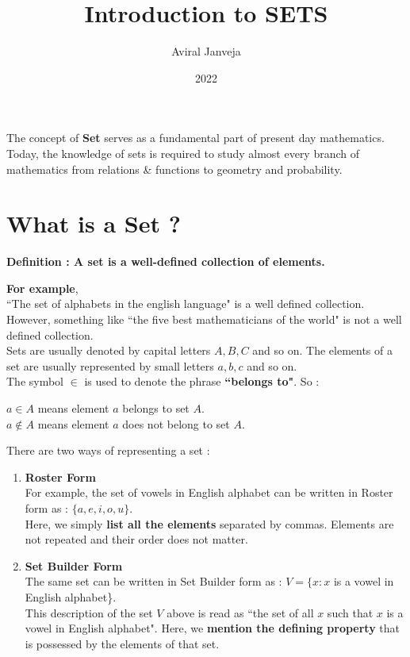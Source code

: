\documentclass[12pt, letterpaper]{article}
\title{\textbf{\Huge Introduction to SETS}}
\author{Aviral Janveja}
\date{2022}
\begin{document}
\maketitle

The concept of \textbf{Set} serves as a fundamental part of present day mathematics.\\ 
Today, the knowledge of sets is required to study almost every branch of mathematics from relations \& functions to geometry and probability.

\section{What is a Set ?}
\begin{displayquote}
\textbf{Definition : A set is a well-defined collection of elements.}
\end{displayquote}
\textbf{For example},\\ 
``The set of alphabets in the english language" is a well defined collection. However, something like ``the five best mathematicians of the world" is not a well defined collection.\\
Sets are usually denoted by capital letters $A, B, C$ and so on. The elements of a set are usually represented by small letters $a, b, c$ and so on.\\
The symbol $\mathbf{\in}$ is used to denote the phrase \textbf{``belongs to"}. So : 
\begin{displayquote}
$a \in A$ means element $a$ belongs to set $A$.\\
$a \notin A$ means element $a$ does not belong to set $A$.
\end{displayquote}
There are two ways of representing a set : 
\begin{enumerate}
    \item \textbf{Roster Form}\\
    For example, the set of vowels in English alphabet can be written in Roster form as : $\{a,e,i,o,u\}$.\\
    Here, we simply \textbf{list all the elements} separated by commas. Elements are not repeated and their order does not matter.
    \item \textbf{Set Builder Form}\\
    The same set can be written in Set Builder form as : $V = \{x : x$ is a vowel in English alphabet\}.\\
    This description of the set $V$ above is read as ``the set of all $x$ such that $x$ is a vowel in English alphabet". Here, we \textbf{mention the defining property} that is possessed by the elements of that set.
\end{enumerate}
\end{document}
